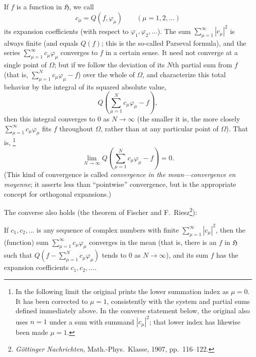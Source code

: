 \documentclass[fontsize=13pt,paper=b5,twoside,bookmarkpackage=false]{scrartcl}
\newcounter{translatornote}
\newcommand{\tnote}[1]{%
  \begingroup\stepcounter{translatornote}%
  \renewcommand{\thefootnote}{T\arabic{translatornote}}%
  \footnote[0]{#1}\endgroup}
\begin{document}
If $f$ is a function in $\mathfrak{H}$, we call
\[
c_\mu=Q(f,\varphi_\mu)\qquad(\mu=1,2,\ldots)
\]
its expansion coefficients (with respect to $\varphi_1,\varphi_2,\ldots$). The sum $\sum_{\mu=1}^{\infty}|c_\mu|^2$ is always finite (and equals $Q(f)$; this is the so-called Parseval formula), and the series $\sum_{\mu=1}^{\infty}c_\mu\varphi_\mu$ converges to $f$ in a certain sense. It need not converge at a single point of $\Omega$; but if we follow the deviation of its $N$th partial sum from $f$ (that is, $\sum_{\mu=1}^{N}c_\mu\varphi_\mu-f$) over the whole of $\Omega$, and characterize this total behavior by the integral of its squared absolute value,
\[
Q\!\left(\sum_{\mu=1}^{N}c_\mu\varphi_\mu-f\right),
\]
then this integral converges to $0$ as $N\to\infty$ (the smaller it is, the more closely $\sum_{\mu=1}^{\infty}c_\mu\varphi_\mu$ fits $f$ throughout $\Omega$, rather than at any particular point of $\Omega$). That is,\tnote{In the following limit the original prints the lower summation index as $\mu=0$. It has been corrected to $\mu=1$, consistently with the system and partial sums defined immediately above. In the converse statement below, the original also uses $n=1$ under a sum with summand $|c_\mu|^2$; that lower index has likewise been made $\mu=1$.}
\[
\lim_{N\to\infty}Q\!\left(\sum_{\mu=1}^{N}c_\mu\varphi_\mu-f\right)=0.
\]
(This kind of convergence is called \emph{convergence in the mean}---\emph{convergence en moyenne}; it asserts less than ``pointwise'' convergence, but is the appropriate concept for orthogonal expansions.)

The converse also holds (the theorem of Fischer and F.\ Riesz\footnote[15]{\label{fn:15}\emph{G\"ottinger Nachrichten}, Math.-Phys.\ Klasse, 1907, pp.\ 116--122.}):

If $c_1,c_2,\ldots$ is any sequence of complex numbers with finite $\sum_{\mu=1}^{\infty}|c_\mu|^2$, then the (function) sum $\sum_{\mu=1}^{\infty}c_\mu\varphi_\mu$ converges in the mean (that is, there is an $f$ in $\mathfrak{H}$ such that $Q(f-\sum_{\mu=1}^{N}c_\mu\varphi_\mu)$ tends to $0$ as $N\to\infty$), and its sum $f$ has the expansion coefficients $c_1,c_2,\ldots$.
\end{document}
